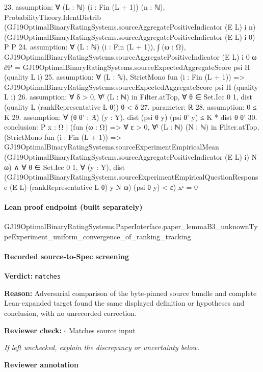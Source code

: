 \documentclass[10pt]{article}
\newcommand{\reviewerbox}{%
  \par\noindent\fbox{\parbox{0.96\linewidth}{\rule{0pt}{0.38in}}}\par
}
\newcommand{\reviewmatch}[1]{%
  \par\noindent\textbf{Reviewer check:} $\square$\; #1\par
  \noindent\emph{If left unchecked, explain the discrepancy or uncertainty below.}\par
}
\begin{document}
\begin{ReviewVerbatim}
23. assumption: ∀ (L : ℕ) (i : Fin (L + 1)) (n : ℕ),
  ProbabilityTheory.IdentDistrib (GJ19OptimalBinaryRatingSystems.sourceAggregatePositiveIndicator (E L) i n)
    (GJ19OptimalBinaryRatingSystems.sourceAggregatePositiveIndicator (E L) i 0) P P
24. assumption: ∀ (L : ℕ) (i : Fin (L + 1)),
  ∫ (ω : Ω), GJ19OptimalBinaryRatingSystems.sourceAggregatePositiveIndicator (E L) i 0 ω ∂P =
    GJ19OptimalBinaryRatingSystems.sourceExpectedAggregateScore psi H (quality L i)
25. assumption: ∀ (L : ℕ),
  StrictMono fun (i : Fin (L + 1)) => GJ19OptimalBinaryRatingSystems.sourceExpectedAggregateScore psi H (quality L i)
26. assumption: ∀ δ > 0, ∀ᶠ (L : ℕ) in Filter.atTop, ∀ θ ∈ Set.Icc 0 1, dist (quality L (rankRepresentative L θ)) θ < δ
27. parameter: ℝ
28. assumption: 0 ≤ K
29. assumption: ∀ (θ θ' : ℝ) (y : Y), dist (psi θ y) (psi θ' y) ≤ K * dist θ θ'
30. conclusion: P
    {x : Ω |
        (fun (ω : Ω) =>
            ∀ ε > 0,
              ∀ᶠ (L : ℕ) (N : ℕ) in Filter.atTop,
                (StrictMono fun (i : Fin (L + 1)) =>
                    GJ19OptimalBinaryRatingSystems.sourceExperimentEmpiricalMean
                      (GJ19OptimalBinaryRatingSystems.sourceAggregatePositiveIndicator (E L) i) N ω) ∧
                  ∀ θ ∈ Set.Icc 0 1,
                    ∀ (y : Y),
                      dist
                          (GJ19OptimalBinaryRatingSystems.sourceExperimentEmpiricalQuestionResponse (E L)
                            (rankRepresentative L θ) y N ω)
                          (psi θ y) <
                        ε)
          x}ᶜ =
  0
\end{ReviewVerbatim}

\paragraph{Lean proof endpoint (built separately)}\begin{ReviewVerbatim}
GJ19OptimalBinaryRatingSystems.PaperInterface.paper_lemmaB3_unknownTypeExperiment_uniform_convergence_of_ranking_tracking
\end{ReviewVerbatim}

\paragraph{Recorded source-to-Spec screening}
\textbf{Verdict:} \texttt{matches}
\\
{\raggedright
\textbf{Reason:} Adversarial comparison of the byte-\allowbreak{}pinned source bundle and complete Lean-\allowbreak{}expanded target found the same displayed definition or hypotheses and conclusion, with no unrecorded correction.\allowbreak{}
\par}
\reviewmatch{Matches source input}
\noindent\textbf{Reviewer annotation}\par
\reviewerbox
\clearpage
\hypertarget{source-claim-99b64aa08841b772}{}
\end{document}
